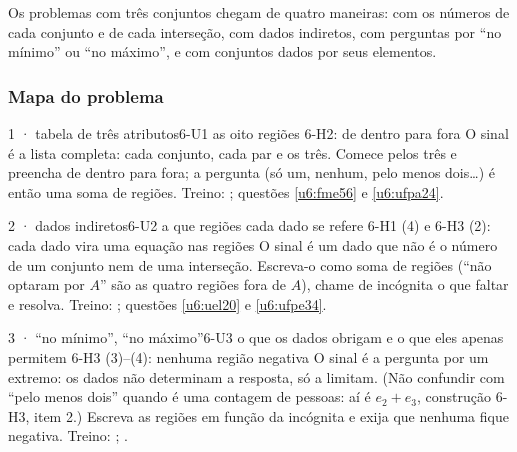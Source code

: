 \OndeEUsado

Os problemas com três conjuntos chegam de quatro maneiras: com os números de cada conjunto e de cada interseção, com dados indiretos, com perguntas por \enquote{no mínimo} ou \enquote{no máximo}, e com conjuntos dados por seus elementos.

\subsubsection{Mapa do problema}

\begin{caso}{1 · tabela de três atributos}{6-U1}
{as oito regiões}
{6-H2: de dentro para fora}
\reconhecer O sinal é a lista completa: cada conjunto, cada par e os três. Comece pelos três e preencha de dentro para fora; a pergunta (só um, nenhum, pelo menos dois\ldots) é então uma soma de regiões. Treino: ; questões \ref{u6:fme56} e \ref{u6:ufpa24}.
\end{caso}

\begin{caso}{2 · dados indiretos}{6-U2}
{a que regiões cada dado se refere}
{6-H1 (4) e 6-H3 (2): cada dado vira uma equação nas regiões}
\reconhecer O sinal é um dado que não é o número de um conjunto nem de uma interseção. Escreva-o como soma de regiões (\enquote{não optaram por $A$} são as quatro regiões fora de $A$), chame de incógnita o que faltar e resolva. Treino: ; questões \ref{u6:uel20} e \ref{u6:ufpe34}.
\end{caso}

\begin{caso}{3 · \enquote{no mínimo}, \enquote{no máximo}}{6-U3}
{o que os dados obrigam e o que eles apenas permitem}
{6-H3 (3)–(4): nenhuma região negativa}
\reconhecer O sinal é a pergunta por um extremo: os dados não determinam a resposta, só a limitam. (Não confundir com \enquote{pelo menos dois} quando é uma contagem de pessoas: aí é $e_2+e_3$, construção 6-H3, item 2.) Escreva as regiões em função da incógnita e exija que nenhuma fique negativa. Treino: ; .
\end{caso}

